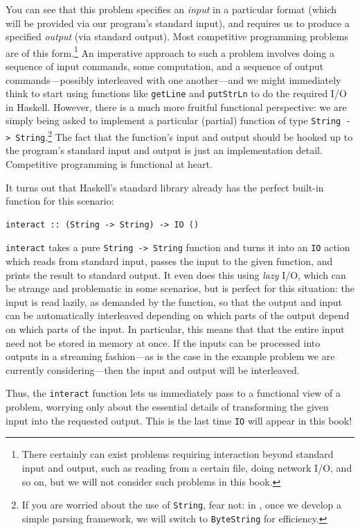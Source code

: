 \documentclass{book}
\newcommand{\pref}[1]{\prettyref{#1}}
\newcommand{\h}[1]{\texttt{#1}}
\begin{document}
You can see that this problem specifies an \emph{input} in a
particular format (which will be provided via our program's standard
input), and requires us to produce a specified \emph{output} (via
standard output).  Most competitive programming problems are of this
form.\footnote{There certainly can exist problems requiring
  interaction beyond standard input and output, such as reading from a
  certain file, doing network I/O, and so on, but we will not consider
  such problems in this book.} An imperative approach to such a
problem involves doing a sequence of input commands, some computation,
and a sequence of output commands---possibly interleaved with one
another---and we might immediately think to start using functions like
\h{getLine} and \h{putStrLn} to do the required I/O in Haskell.  However,
there is a much more fruitful functional perspective: we are simply
being asked to implement a particular (partial) function of type
\h{String -> String}.\footnote{If you are worried about the use of
  \h{String}, fear not: in \pref{chap:parsing}, once we develop a simple parsing
  framework, we will switch to \h{ByteString} for efficiency.}  The fact
that the function's input and output should be hooked up to the
program's standard input and output is just an implementation detail.
Competitive programming is functional at heart.

It turns out that Haskell's standard library already has the perfect
built-in function for this scenario:
\begin{verbatim}
interact :: (String -> String) -> IO ()
\end{verbatim}
\h{interact} takes a pure \h{String -> String} function and turns it into
an \h{IO} action which reads from standard input, passes the input to
the given function, and prints the result to standard output.  It even
does this using \emph{lazy} I/O, which can be strange and problematic
in some scenarios, but is perfect for this situation: the input is
read lazily, as demanded by the function, so that the output and input
can be automatically interleaved depending on which parts of the
output depend on which parts of the input. In particular, this means
that that the entire input need not be stored in memory at once. If
the inputs can be processed into outputs in a streaming fashion---as
is the case in the example problem we are currently
considering---then the input and output will be interleaved.

Thus, the \h{interact} function lets us immediately pass to a functional
view of a problem, worrying only about the essential details of
transforming the given input into the requested output.  This is the
last time \h{IO} will appear in this book! 
\end{document}
